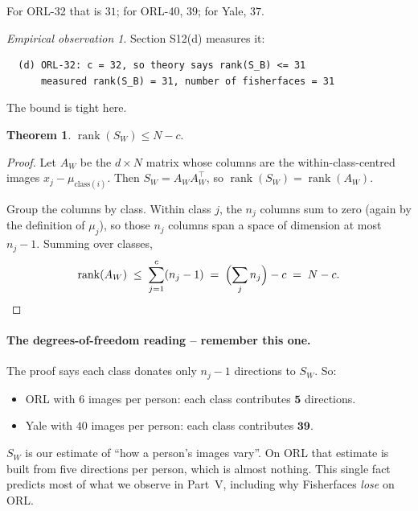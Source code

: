 \documentclass[11pt]{article}
\theoremstyle{definition}
\newtheorem{theorem}{Theorem}[section]
\theoremstyle{remark}
\newtheorem*{observation}{Empirical observation}
\newcommand{\Sw}{S_W}
\newcommand{\rank}{\operatorname{rank}}
\begin{document}
For ORL-32 that is $31$; for ORL-40, $39$; for Yale, $37$.

\begin{observation}
Section S12(d) measures it:
\begin{lstlisting}
  (d) ORL-32: c = 32, so theory says rank(S_B) <= 31
      measured rank(S_B) = 31, number of fisherfaces = 31
\end{lstlisting}
The bound is tight here.
\end{observation}

\begin{theorem}\label{thm:rankSw}
$\rank(\Sw)\le N-c$.
\end{theorem}
\begin{proof}
Let $A_W$ be the $d\times N$ matrix whose columns are the within-class-centred
images $x_j-\mu_{\text{class}(i)}$. Then $\Sw=A_WA_W^{\!\top}$, so
$\rank(\Sw)=\rank(A_W)$.

Group the columns by class. Within class $j$, the $n_j$ columns sum to zero (again
by the definition of $\mu_j$), so those $n_j$ columns span a space of dimension at
most $n_j-1$. Summing over classes,
\[
  \rank(A_W)\;\le\;\sum_{j=1}^{c}(n_j-1) \;=\; \Bigl(\sum_j n_j\Bigr) - c \;=\; N-c. \qedhere
\]
\end{proof}

\paragraph{The degrees-of-freedom reading -- remember this one.}
The proof says each class donates only $n_j-1$ directions to $\Sw$. So:
\begin{itemize}[nosep]
\item ORL with $6$ images per person: each class contributes $\mathbf{5}$ directions.
\item Yale with $40$ images per person: each class contributes $\mathbf{39}$.
\end{itemize}
$\Sw$ is our estimate of ``how a person's images vary''. On ORL that estimate is
built from five directions per person, which is almost nothing. This single fact
predicts most of what we observe in Part~V, including why Fisherfaces \emph{lose}
on ORL.
\end{document}
